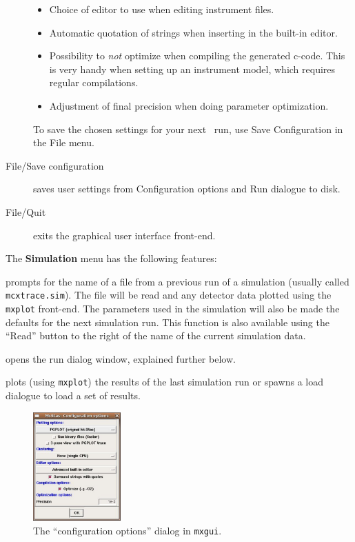 \begin{description}
\begin{itemize}
  \item Choice of editor to use when editing instrument files.
  \item Automatic quotation of strings when inserting in the built-in
    editor.
  \item Possibility to \emph{not} optimize when compiling the
    generated c-code. This is very handy when setting up an instrument model, which requires regular compilations.
  \item Adjustment of final precision when doing parameter optimization.
\end{itemize}
To save the chosen settings for your next \MCX\ run, use Save
Configuration in the File menu.
\item[File/Save configuration] saves user settings from Configuration
  options and Run dialogue to disk.
\item[File/Quit] exits the graphical user interface front-end.
\end{description}

\noindent The {\bfseries Simulation} menu has the following features:
\begin{description} 
\item[Simulation/Read old simulation] prompts for the name of a file
  from a previous run of a \MCX  simulation (usually called
  \verb+mcxtrace.sim+). The file will be read and any detector data
  plotted using the \verb+mxplot+ front-end. The parameters used in the
  simulation will also be made the defaults for the next simulation
  run. This function is also available using the ``Read'' button to the
  right of the name of the current simulation data.
\item[Simulation/Run simulation] opens the run dialog window, explained
  further below.
\item[Simulation/Plot results] plots (using \verb+mxplot+) the results of the
  last simulation run or spawns a load dialogue to load a set of results.
\end{description}


\begin{figure}[htb!]
  \begin{center}
    \includegraphics[width=0.3\textwidth]{figures/choose_backend.eps}
  \end{center}
\caption{The ``configuration options'' dialog in \texttt{mxgui}.} 
\label{fig:mxgui-choose}
\end{figure}


